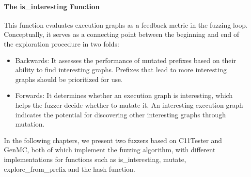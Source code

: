 \paragraph*{The is\_interesting Function} 
This function evaluates execution graphs as a feedback metric in the fuzzing loop. Conceptually, it serves as a connecting point between the beginning and end of the exploration procedure in two folds:
\begin{itemize}
    \item Backwards: It assesses the performance of mutated prefixes based on their ability to find interesting graphs. Prefixes that lead to more interesting graphs should be prioritized for use.
    \item Forwards: It determines whether an execution graph is interesting, which helps the fuzzer decide whether to mutate it. An interesting execution graph indicates the potential for discovering other interesting graphs through mutation.
\end{itemize}

 




In the following chapters, we present two fuzzers based on C11Tester and GenMC, both of which implement the fuzzing algorithm, with different implementations for functions such as is\_interesting, mutate,  explore\_from\_prefix and the hash function.













